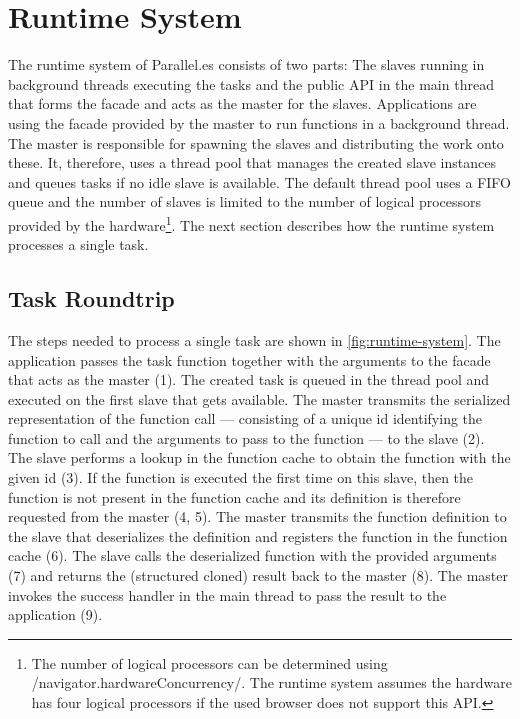 \section{Runtime System}\label{sec:runtime-system}
The runtime system of Parallel.es consists of two parts: The slaves running in background threads executing the tasks and the public API in the main thread that forms the facade and acts as the master for the slaves. Applications are using the facade provided by the master to run functions in a background thread. The master is responsible for spawning the slaves and distributing the work onto these. It, therefore, uses a thread pool that manages the created slave instances and queues tasks if no idle slave is available. The default thread pool uses a FIFO queue and the number of slaves is limited to the number of logical processors provided by the hardware\footnote{The number of logical processors can be determined using \javascriptinline/navigator.hardwareConcurrency/. The runtime system assumes the hardware has four logical processors if the used browser does not support this API.}. The next section describes how the runtime system processes a single task. 

\subsection{Task Roundtrip}
The steps needed to process a single task are shown in \cref{fig:runtime-system}. The application passes the task function together with the arguments to the facade that acts as the master (1). The created task is queued in the thread pool and executed on the first slave that gets available. The master transmits the serialized representation of the function call --- consisting of a unique id identifying the function to call and the arguments to pass to the function --- to the slave (2). The slave performs a lookup in the function cache to obtain the function with the given id (3). If the function is executed the first time on this slave, then the function is not present in the function cache and its definition is therefore requested from the master (4, 5). The master transmits the function definition to the slave that deserializes the definition and registers the function in the function cache (6). The slave calls the deserialized function with the provided arguments (7) and returns the (structured cloned) result back to the master (8). The master invokes the success handler in the main thread to pass the result to the application (9). 


